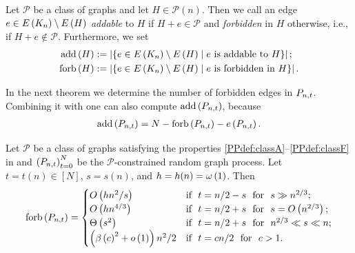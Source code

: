 \begin{definition}
Let $\mathcal{P}$ be a class of graphs and let $H\in \mathcal{P}(n)$. Then we call an edge $e\in E\left(K_n\right)\setminus E\left(H\right)$ \textit{addable} to $H$ if $H+e\in \mathcal{P}$ and \textit{forbidden} in $H$ otherwise, i.e., if $H+e\notin \mathcal{P}$. Furthermore, we set
\begin{align*}
	\operatorname{add}\left(H\right)&:=\left|\left\{e\in E\left(K_n\right)\setminus E\left(H\right) \mid e \text{ is addable to }H\right\}\right|;\\
	\operatorname{forb}\left(H\right)&:=\left|\left\{e\in E\left(K_n\right)\setminus E\left(H\right) \mid e \text{ is forbidden in } H\right\}\right|.
\end{align*}
\end{definition}

In the next theorem we determine the number of forbidden edges in $P_{n,t}$. Combining it with  one can also compute $\operatorname{add}\left(P_{n,t}\right)$, because
\begin{align*}
\operatorname{add}\left(P_{n,t}\right)=N-\operatorname{forb}\left(P_{n,t}\right)-e\left({P_{n,t}}\right).
\end{align*}

\begin{thm}\label{PPthm:forbidden}
Let $\mathcal{P}$ be a class of graphs satisfying the properties \ref{PPdef:classA}--\ref{PPdef:classF} in  and $\left(P_{n,t}\right)_{t=0}^{N}$ be the $\mathcal{P}$-constrained random graph process. Let $t=t(n)\in\left[N\right]$, $s=s(n)$, and $h=h(n)=\omega\left(1\right)$. Then \whp
	\begin{align*}
	\operatorname{forb}\left(P_{n,t}\right)=
	\begin{cases}
		O\left(hn^2/s\right) & \text{if} ~~ t=n/2-s ~~\text{for}~~ s\gg n^{2/3};
		\\
		O\left(hn^{4/3}\right)& \text{if} ~~ t=n/2+s ~~\text{for}~~ s=O\left(n^{2/3}\right);
		\\
		\Theta\left(s^2\right)& \text{if} ~~ t=n/2+s ~~\text{for}~~ n^{2/3}\ll s\ll n;
		\\
		\left(\beta\left(c\right)^2+o\left(1\right)\right)n^2/2& \text{if} ~~ t=cn/2 ~~\text{for}~~ c>1.
	\end{cases}
\end{align*}
\end{thm}

